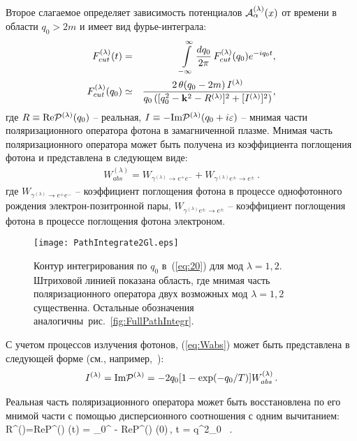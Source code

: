 Второе слагаемое определяет зависимость потенциалов ${\cal A}^{(\lambda)}_\alpha(x)$ от времени
в области $q_0>2m$ и имеет вид
фурье-интеграла:
%
\begin{eqnarray}
F^{(\lambda)}_{cut}(t) &=& \int \limits_{- \infty}^{\infty} \frac{dq_0}{2 \pi}\,
F^{(\lambda)}_{cut}(q_0)e^{- i q_0 t},
\label{eq:20} 
\\
F^{(\lambda)}_{cut}(q_0) &\simeq& 
\frac{2 \,\theta (q_0  -  2 m)\,I^{(\lambda)}}
{q_0\,([ q_0^2 - {\bf k}^2 - R^{(\lambda)}]^2 + [I^{(\lambda)}]^2)},
\label{eq:21}
\end{eqnarray}
%
где $R \equiv \text{Re} {\cal P}^{(\lambda)}(q_0)$  – реальная, $I \equiv  - \text{Im} {\cal P}^{(\lambda)}(q_0 + i \varepsilon)$ – мнимая 
части поляризационного оператора фотона в замагниченной плазме.
\newpage
Мнимая часть поляризационного оператора может быть получена из коэффициента  
поглощения фотона и представлена в следующем виде:
\begin{eqnarray}
W^{(\lambda)}_{abs} = W_{\gamma^{(\lambda)} \to e^+ e^-} + W_{\gamma^{(\lambda)} e^{\pm} \to e^{\pm}} \, .
\label{eq:Wabs}
\end{eqnarray}
где $W_{\gamma^{(\lambda)} \to e^+ e^-}$ -- коэффициент поглощения фотона в процессе однофотонного рождения электрон-позитронной пары, $W_{\gamma^{(\lambda)} e^{\pm} \to e^{\pm}}$ -- коэффициент поглощения фотона в процессе поглощения фотона электроном.

\begin{figure}[t]\centering
	\texttt{[image: PathIntegrate2Gl.eps]}
	\caption{Контур интегрирования по $q_0$ в~(\ref{eq:20}) для мод $\lambda = 1,2$. Штриховой линией показана область, где мнимая часть поляризационного оператора двух возможных мод $\lambda = 1,2$ существенна. Остальные обозначения аналогичны~рис.~\ref{fig:FullPathIntegr}.}\label{fig:PathIntegr}
\end{figure}

С учетом процессов излучения фотонов, (\ref{eq:Wabs}) может быть представлена в следующей форме (см., например,~\cite{Shabad:1988, Rumyantsev:2017,Weldon:1983}): 
\begin{eqnarray}\label{eq:Ilambda}
I^{(\lambda)}=\text{Im} {\cal P}^{(\lambda)} =  -2 q_0 [1-\exp (-q_0/T)] W^{(\lambda)}_{abs} \, . 
\label{eq:ImP}
\end{eqnarray}

Реальная часть 
поляризационного оператора может быть восстановлена по его мнимой части с помощью дисперсионного соотношения с одним 
вычитанием:
%
\beq 
R^{(\lambda)}=\textrm{Re}{\cal P}^{(\lambda)} (t) = \int \limits_0^\infty {} - \textrm{Re}{\cal P}^{(\lambda)} (0)\,, \qquad  t = q^2_0 \, .
\label{eq:Disp}
\eeq

